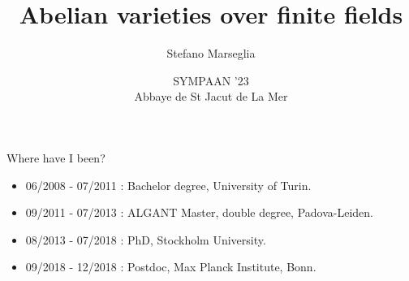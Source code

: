 \documentclass[usenames,dvipsnames,handout]{beamer}
\title[]{ Abelian varieties over finite fields}
\subtitle{}
\author[Stefano Marseglia]{Stefano Marseglia}
\institute[]{Utrecht University}
\date[ 05/10/2023 ]{SYMPAAN '23\\Abbaye de St Jacut de La Mer}
\begin{document}
\begin{frame}
    \titlepage
\end{frame}

\begin{frame}{Where have I been?}
    \begin{itemize}
        \vspace{-2cm}
         \item 06/2008 - 07/2011 : Bachelor degree, University of Turin.
         \item 09/2011 - 07/2013 : ALGANT Master, double degree, Padova-Leiden.
        \vspace{-4.4cm}
         \item 08/2013 - 07/2018 : PhD, Stockholm University.
        \vspace{-5.4cm}
         \item 09/2018 - 12/2018 : Postdoc, Max Planck Institute, Bonn.

\end{itemize}
\end{frame}
\end{document}
